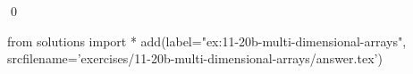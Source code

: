 
\begin{ex} 
  \label{ex:11-20b-multi-dimensional-arrays}
  
  \qed
\end{ex} 
\begin{python0}
from solutions import *
add(label="ex:11-20b-multi-dimensional-arrays",
    srcfilename='exercises/11-20b-multi-dimensional-arrays/answer.tex') 
\end{python0}
